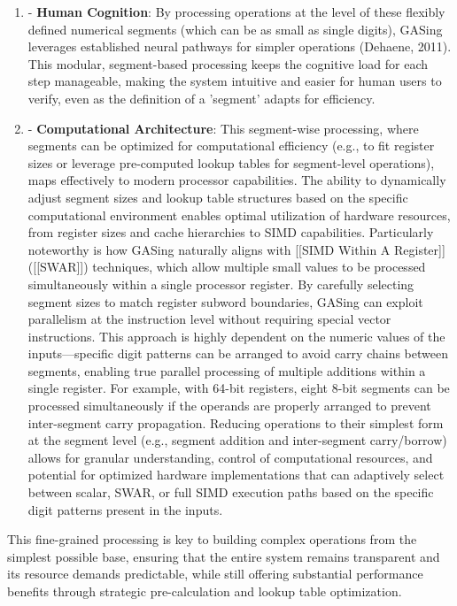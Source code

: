 \documentclass[11pt,a4paper]{article}
\begin{document}
\begin{enumerate}
  \item - \textbf{Human Cognition}: By processing operations at the level of these flexibly defined numerical segments (which can be as small as single digits), GASing leverages established neural pathways for simpler operations (Dehaene, 2011). This modular, segment-based processing keeps the cognitive load for each step manageable, making the system intuitive and easier for human users to verify, even as the definition of a 'segment' adapts for efficiency.
  \item - \textbf{Computational Architecture}: This segment-wise processing, where segments can be optimized for computational efficiency (e.g., to fit register sizes or leverage pre-computed lookup tables for segment-level operations), maps effectively to modern processor capabilities. The ability to dynamically adjust segment sizes and lookup table structures based on the specific computational environment enables optimal utilization of hardware resources, from register sizes and cache hierarchies to SIMD capabilities. Particularly noteworthy is how GASing naturally aligns with [[SIMD Within A Register]] ([[SWAR]]) techniques, which allow multiple small values to be processed simultaneously within a single processor register. By carefully selecting segment sizes to match register subword boundaries, GASing can exploit parallelism at the instruction level without requiring special vector instructions. This approach is highly dependent on the numeric values of the inputs—specific digit patterns can be arranged to avoid carry chains between segments, enabling true parallel processing of multiple additions within a single register. For example, with 64-bit registers, eight 8-bit segments can be processed simultaneously if the operands are properly arranged to prevent inter-segment carry propagation. Reducing operations to their simplest form at the segment level (e.g., segment addition and inter-segment carry/borrow) allows for granular understanding, control of computational resources, and potential for optimized hardware implementations that can adaptively select between scalar, SWAR, or full SIMD execution paths based on the specific digit patterns present in the inputs.
\end{enumerate}

This fine-grained processing is key to building complex operations from the simplest possible base, ensuring that the entire system remains transparent and its resource demands predictable, while still offering substantial performance benefits through strategic pre-calculation and lookup table optimization.
\end{document}
